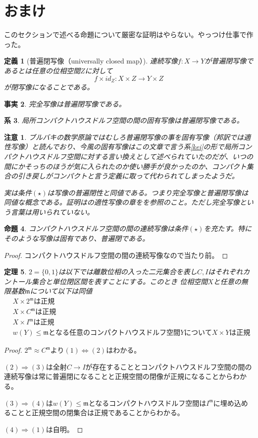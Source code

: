 \documentclass[leqno]{jsarticle}
\newtheorem{thm}{定理}
\newtheorem{prop}[thm]{命題}
\newtheorem{cor}[thm]{系}
\newtheorem{df}[thm]{定義}
\newtheorem{fact}[thm]{事実}
\newtheorem*{cau}{注意}
\newcommand{\To}{\Longrightarrow}
\newcommand{\m}{\mathfrak{m}}
\begin{document}
\section{おまけ}
このセクションで述べる命題について厳密な証明はやらない。やっつけ仕事で作った。
\begin{df}[普遍閉写像（universally closed map）]
連続写像$f:X\to Y$が普遍閉写像であるとは任意の位相空間$Z$に対して
\[
f\times id_Z:X\times Z\to Y\times Z
\]
が閉写像になることである。
\end{df}
\begin{fact}
完全写像は普遍閉写像である。
\end{fact}
\begin{cor}
局所コンパクトハウスドルフ空間の間の固有写像は普遍閉写像である。
\end{cor}
\begin{cau}
ブルバキの数学原論ではむしろ普遍閉写像の事を固有写像（邦訳では適性写像）と読んでおり、今風の固有写像はこの文章で言う系\textrm{\ref{kei}}の形で局所コンパクトハウスドルフ空間に対する言い換えとして述べられていたのだが、いつの間にかそっちのほうが気に入られたのか使い勝手が良かったのか、コンパクト集合の引き戻しがコンパクトと言う定義に取って代わられてしまったようだ。\par
実は条件$(\star)$は写像の普遍閉性と同値である。つまり完全写像と普遍閉写像は同値な概念である。証明は\cite{1}の適性写像の章をを参照のこと。ただし完全写像という言葉は用いられていない。
\end{cau}
\begin{prop}
コンパクトハウスドルフ空間の間の連続写像は条件$(\star)$を充たす。特にそのような写像は固有であり、普遍閉である。
\end{prop}
\begin{proof}
コンパクトハウスドルフ空間の間の連続写像なので当たり前。
\end{proof}
\setcounter{equation}{0}
\begin{thm}$2=\{0,1\}$は以下では離散位相の入った二元集合を表し$C,I$はそれぞれカントール集合と単位閉区間を表すことにする。このとき
位相空間$X$と任意の無限基数$\mathfrak{m}$について以下は同値
\begin{eqnarray}
&X\times 2^{\m}は正規\\ 
&X\times C^{\m}は正規\\ 
&X\times I^{\m}は正規\\ 
&w(Y)\le \m となる任意のコンパクトハウスドルフ空間YについてX\times Y は正規
\end{eqnarray}
\end{thm}
\begin{proof}
$2^{\m}\approx C^{\m}$より$(1)\iff(2)$はわかる。\par
$(2)\To(3)$は全射$C\to I$が存在することとコンパクトハウスドルフ空間の間の連続写像は常に普遍閉になることと正規空間の閉像が正規になることからわかる。\par
$(3)\To (4)$は$w(Y)\le \m$となるコンパクトハウスドルフ空間は$I^{\m}$に埋め込めることと正規空間の閉集合は正規であることからわかる。\par
$(4)\To(1)$は自明。
\end{proof}
\end{document}
